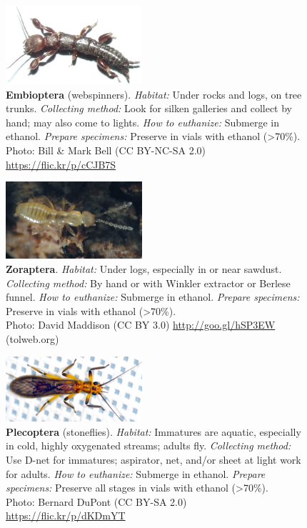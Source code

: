 \documentclass[letterpaper, 11pt]{article}
\begin{document}
\begin{figure}
  \caption{\textbf{Embioptera} (webspinners). \textit{Habitat:} Under rocks and logs, on tree trunks. \textit{Collecting method:} Look for silken galleries and collect by hand; may also come to lights. \textit{How to euthanize:} Submerge in ethanol. \textit{Prepare specimens:} Preserve in vials with ethanol (\textgreater70\%).\\ Photo: Bill \& Mark Bell (CC BY-NC-SA 2.0) \url{https://flic.kr/p/cCJB7S}}
  \includegraphics[width=0.45\textwidth]{Embioptera}
\end{figure}

\begin{figure}
  \caption{\textbf{Zoraptera}. \textit{Habitat:} Under logs, especially in or near sawdust. \textit{Collecting method:} By hand or with Winkler extractor or Berlese funnel. \textit{How to euthanize:} Submerge in ethanol. \textit{Prepare specimens:} Preserve in vials with ethanol (\textgreater70\%).\\ Photo: David Maddison (CC BY 3.0) \url{http://goo.gl/hSP3EW} (tolweb.org)}
  \includegraphics[width=0.45\textwidth]{Zoraptera}
\end{figure}

\begin{figure}
  \caption{\textbf{Plecoptera} (stoneflies). \textit{Habitat:} Immatures are aquatic, especially in cold, highly oxygenated streams; adults fly. \textit{Collecting method:} Use D-net for immatures; aspirator, net, and/or sheet at light work for adults. \textit{How to euthanize:} Submerge in ethanol. \textit{Prepare specimens:} Preserve all stages in vials with ethanol (\textgreater70\%).\\ Photo: Bernard DuPont (CC BY-SA 2.0) \url{https://flic.kr/p/dKDmYT}}
  \includegraphics[width=0.45\textwidth]{Plecoptera}
\end{figure}
\end{document}
